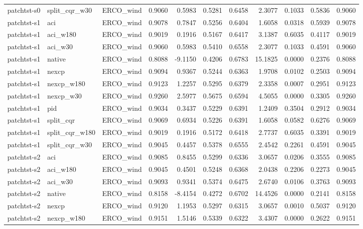 \begin{tabular}{lllrrrrrrrr}
patchtst-s0 & split_cqr_w30 & ERCO_wind & 0.9060 & 0.5983 & 0.5281 & 0.6458 & 2.3077 & 0.1033 & 0.5836 & 0.9060 \\
patchtst-s1 & aci & ERCO_wind & 0.9078 & 0.7847 & 0.5256 & 0.6404 & 1.6058 & 0.0318 & 0.5939 & 0.9078 \\
patchtst-s1 & aci_w180 & ERCO_wind & 0.9019 & 0.1916 & 0.5167 & 0.6417 & 3.1387 & 0.6035 & 0.4117 & 0.9019 \\
patchtst-s1 & aci_w30 & ERCO_wind & 0.9060 & 0.5983 & 0.5410 & 0.6558 & 2.3077 & 0.1033 & 0.4591 & 0.9060 \\
patchtst-s1 & native & ERCO_wind & 0.8088 & -9.1150 & 0.4206 & 0.6783 & 15.1825 & 0.0000 & 0.2376 & 0.8088 \\
patchtst-s1 & nexcp & ERCO_wind & 0.9094 & 0.9367 & 0.5244 & 0.6363 & 1.9708 & 0.0102 & 0.2503 & 0.9094 \\
patchtst-s1 & nexcp_w180 & ERCO_wind & 0.9123 & 1.2257 & 0.5295 & 0.6379 & 2.3358 & 0.0007 & 0.2951 & 0.9123 \\
patchtst-s1 & nexcp_w30 & ERCO_wind & 0.9260 & 2.5977 & 0.5675 & 0.6594 & 4.5055 & 0.0000 & 0.3305 & 0.9260 \\
patchtst-s1 & pid & ERCO_wind & 0.9034 & 0.3437 & 0.5229 & 0.6391 & 1.2409 & 0.3504 & 0.2912 & 0.9034 \\
patchtst-s1 & split_cqr & ERCO_wind & 0.9069 & 0.6934 & 0.5226 & 0.6391 & 1.6058 & 0.0582 & 0.6276 & 0.9069 \\
patchtst-s1 & split_cqr_w180 & ERCO_wind & 0.9019 & 0.1916 & 0.5172 & 0.6418 & 2.7737 & 0.6035 & 0.3391 & 0.9019 \\
patchtst-s1 & split_cqr_w30 & ERCO_wind & 0.9045 & 0.4457 & 0.5378 & 0.6555 & 2.4542 & 0.2261 & 0.4591 & 0.9045 \\
patchtst-s2 & aci & ERCO_wind & 0.9085 & 0.8455 & 0.5299 & 0.6336 & 3.0657 & 0.0206 & 0.3555 & 0.9085 \\
patchtst-s2 & aci_w180 & ERCO_wind & 0.9045 & 0.4501 & 0.5248 & 0.6368 & 2.0438 & 0.2206 & 0.2273 & 0.9045 \\
patchtst-s2 & aci_w30 & ERCO_wind & 0.9093 & 0.9341 & 0.5374 & 0.6475 & 2.6740 & 0.0106 & 0.3763 & 0.9093 \\
patchtst-s2 & native & ERCO_wind & 0.8158 & -8.4154 & 0.4272 & 0.6702 & 14.4526 & 0.0000 & 0.2141 & 0.8158 \\
patchtst-s2 & nexcp & ERCO_wind & 0.9120 & 1.1953 & 0.5297 & 0.6315 & 3.0657 & 0.0010 & 0.5037 & 0.9120 \\
patchtst-s2 & nexcp_w180 & ERCO_wind & 0.9151 & 1.5146 & 0.5339 & 0.6322 & 3.4307 & 0.0000 & 0.2622 & 0.9151 \\

\end{tabular}
